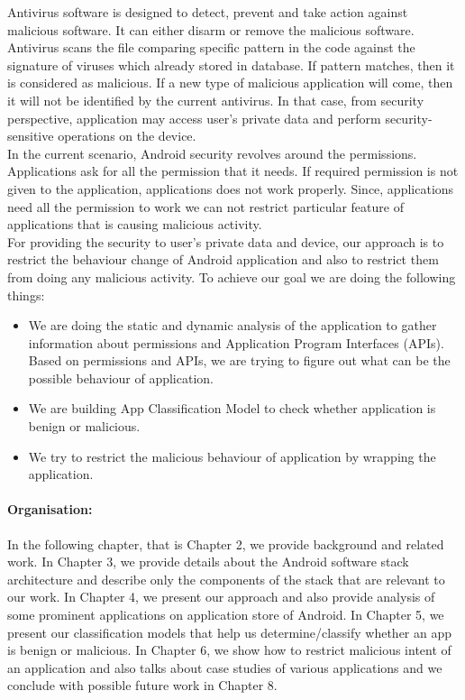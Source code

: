 Antivirus software is designed to detect, prevent and take action against malicious software. It can either disarm or remove the malicious software. Antivirus scans the file comparing specific pattern in the code against the signature of viruses which already stored in database. If pattern matches, then it is considered as malicious. If a new type of malicious application will come, then it will not be identified by the current antivirus. In that case, from security perspective, application may access user's private data and perform security-sensitive operations on the device.\\

In the current scenario, Android security revolves around the permissions. Applications ask for all the permission that it needs. If required permission is not given to the application, applications does not work properly. Since, applications need all the permission to work we can not restrict particular feature of applications that is causing malicious activity.\\

For providing the security to user's private data and device, our approach is to restrict the behaviour change of Android application and also to restrict them from doing any malicious activity. To achieve our goal we are doing the following things:
\begin{itemize}
    \item We are doing the static and dynamic analysis of the application to gather information about permissions and Application Program Interfaces (APIs). Based on permissions and APIs, we are trying to figure out what can be the possible behaviour of application.
    \item We are building App Classification Model to check whether application is benign or malicious.
    \item We try to restrict the malicious behaviour of application by wrapping the application.
\end{itemize}

\paragraph{Organisation:} In the following chapter, that is Chapter 2, we provide background and related work. In Chapter 3, we provide details about the Android software stack architecture and describe only the components of the stack that are relevant to our work. In Chapter 4, we present our approach and also provide analysis of some prominent applications on application store of Android. In Chapter 5, we present our classification models that help us determine/classify whether an app is benign or malicious. In Chapter 6, we show how to restrict malicious intent of an application and also talks about case studies of various applications and  we conclude with possible future work in Chapter 8.